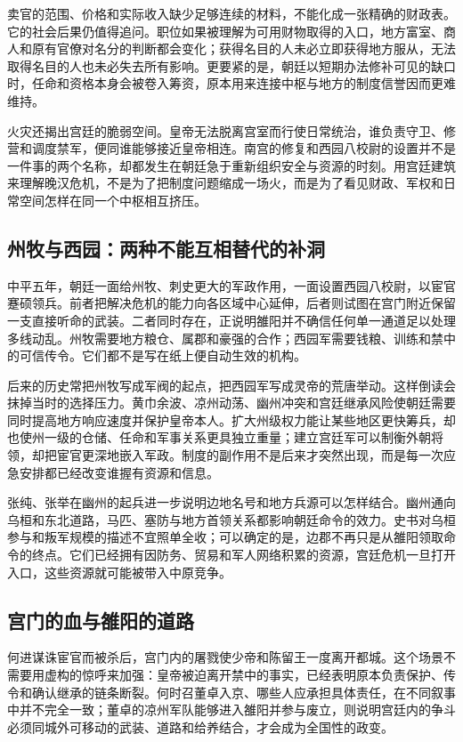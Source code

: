 卖官的范围、价格和实际收入缺少足够连续的材料，不能化成一张精确的财政表。它的社会后果仍值得追问。职位如果被理解为可用财物取得的入口，地方富室、商人和原有官僚对名分的判断都会变化；获得名目的人未必立即获得地方服从，无法取得名目的人也未必失去所有影响。更要紧的是，朝廷以短期办法修补可见的缺口时，任命和资格本身会被卷入筹资，原本用来连接中枢与地方的制度信誉因而更难维持。

火灾还揭出宫廷的脆弱空间。皇帝无法脱离宫室而行使日常统治，谁负责守卫、修营和调度禁军，便同谁能够接近皇帝相连。南宫的修复和西园八校尉的设置并不是一件事的两个名称，却都发生在朝廷急于重新组织安全与资源的时刻。用宫廷建筑来理解晚汉危机，不是为了把制度问题缩成一场火，而是为了看见财政、军权和日常空间怎样在同一个中枢相互挤压。

\subsection{州牧与西园：两种不能互相替代的补洞}

中平五年，朝廷一面给州牧、刺史更大的军政作用，一面设置西园八校尉，以宦官蹇硕领兵。前者把解决危机的能力向各区域中心延伸，后者则试图在宫门附近保留一支直接听命的武装。二者同时存在，正说明雒阳并不确信任何单一通道足以处理多线动乱。州牧需要地方粮仓、属郡和豪强的合作；西园军需要钱粮、训练和禁中的可信传令。它们都不是写在纸上便自动生效的机构。

后来的历史常把州牧写成军阀的起点，把西园军写成灵帝的荒唐举动。这样倒读会抹掉当时的选择压力。黄巾余波、凉州动荡、幽州冲突和宫廷继承风险使朝廷需要同时提高地方响应速度并保护皇帝本人。扩大州级权力能让某些地区更快筹兵，却也使州一级的仓储、任命和军事关系更具独立重量；建立宫廷军可以制衡外朝将领，却把宦官更深地嵌入军政。制度的副作用不是后来才突然出现，而是每一次应急安排都已经改变谁握有资源和信息。

张纯、张举在幽州的起兵进一步说明边地名号和地方兵源可以怎样结合。幽州通向乌桓和东北道路，马匹、塞防与地方首领关系都影响朝廷命令的效力。史书对乌桓参与和叛军规模的描述不宜照单全收；可以确定的是，边郡不再只是从雒阳领取命令的终点。它们已经拥有因防务、贸易和军人网络积累的资源，宫廷危机一旦打开入口，这些资源就可能被带入中原竞争。

\subsection{宫门的血与雒阳的道路}

何进谋诛宦官而被杀后，宫门内的屠戮使少帝和陈留王一度离开都城。这个场景不需要用虚构的惊呼来加强：皇帝被迫离开禁中的事实，已经表明原本负责保护、传令和确认继承的链条断裂。何时召董卓入京、哪些人应承担具体责任，在不同叙事中并不完全一致；董卓的凉州军队能够进入雒阳并参与废立，则说明宫廷内的争斗必须同城外可移动的武装、道路和给养结合，才会成为全国性的政变。


